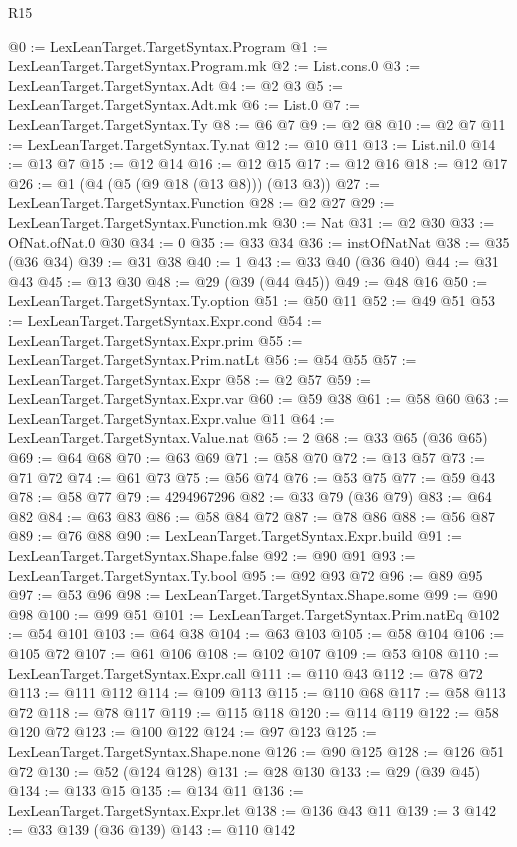 \begin{lexlean}{R15}
\begin{coremodule}
@0 := LexLeanTarget.TargetSyntax.Program
@1 := LexLeanTarget.TargetSyntax.Program.mk
@2 := List.cons.{0}
@3 := LexLeanTarget.TargetSyntax.Adt
@4 := @2 @3
@5 := LexLeanTarget.TargetSyntax.Adt.mk
@6 := List.{0}
@7 := LexLeanTarget.TargetSyntax.Ty
@8 := @6 @7
@9 := @2 @8
@10 := @2 @7
@11 := LexLeanTarget.TargetSyntax.Ty.nat
@12 := @10 @11
@13 := List.nil.{0}
@14 := @13 @7
@15 := @12 @14
@16 := @12 @15
@17 := @12 @16
@18 := @12 @17
@26 := @1 (@4 (@5 (@9 @18 (@13 @8))) (@13 @3))
@27 := LexLeanTarget.TargetSyntax.Function
@28 := @2 @27
@29 := LexLeanTarget.TargetSyntax.Function.mk
@30 := Nat
@31 := @2 @30
@33 := OfNat.ofNat.{0} @30
@34 := 0
@35 := @33 @34
@36 := instOfNatNat
@38 := @35 (@36 @34)
@39 := @31 @38
@40 := 1
@43 := @33 @40 (@36 @40)
@44 := @31 @43
@45 := @13 @30
@48 := @29 (@39 (@44 @45))
@49 := @48 @16
@50 := LexLeanTarget.TargetSyntax.Ty.option
@51 := @50 @11
@52 := @49 @51
@53 := LexLeanTarget.TargetSyntax.Expr.cond
@54 := LexLeanTarget.TargetSyntax.Expr.prim
@55 := LexLeanTarget.TargetSyntax.Prim.natLt
@56 := @54 @55
@57 := LexLeanTarget.TargetSyntax.Expr
@58 := @2 @57
@59 := LexLeanTarget.TargetSyntax.Expr.var
@60 := @59 @38
@61 := @58 @60
@63 := LexLeanTarget.TargetSyntax.Expr.value @11
@64 := LexLeanTarget.TargetSyntax.Value.nat
@65 := 2
@68 := @33 @65 (@36 @65)
@69 := @64 @68
@70 := @63 @69
@71 := @58 @70
@72 := @13 @57
@73 := @71 @72
@74 := @61 @73
@75 := @56 @74
@76 := @53 @75
@77 := @59 @43
@78 := @58 @77
@79 := 4294967296
@82 := @33 @79 (@36 @79)
@83 := @64 @82
@84 := @63 @83
@86 := @58 @84 @72
@87 := @78 @86
@88 := @56 @87
@89 := @76 @88
@90 := LexLeanTarget.TargetSyntax.Expr.build
@91 := LexLeanTarget.TargetSyntax.Shape.false
@92 := @90 @91
@93 := LexLeanTarget.TargetSyntax.Ty.bool
@95 := @92 @93 @72
@96 := @89 @95
@97 := @53 @96
@98 := LexLeanTarget.TargetSyntax.Shape.some
@99 := @90 @98
@100 := @99 @51
@101 := LexLeanTarget.TargetSyntax.Prim.natEq
@102 := @54 @101
@103 := @64 @38
@104 := @63 @103
@105 := @58 @104
@106 := @105 @72
@107 := @61 @106
@108 := @102 @107
@109 := @53 @108
@110 := LexLeanTarget.TargetSyntax.Expr.call
@111 := @110 @43
@112 := @78 @72
@113 := @111 @112
@114 := @109 @113
@115 := @110 @68
@117 := @58 @113 @72
@118 := @78 @117
@119 := @115 @118
@120 := @114 @119
@122 := @58 @120 @72
@123 := @100 @122
@124 := @97 @123
@125 := LexLeanTarget.TargetSyntax.Shape.none
@126 := @90 @125
@128 := @126 @51 @72
@130 := @52 (@124 @128)
@131 := @28 @130
@133 := @29 (@39 @45)
@134 := @133 @15
@135 := @134 @11
@136 := LexLeanTarget.TargetSyntax.Expr.let
@138 := @136 @43 @11
@139 := 3
@142 := @33 @139 (@36 @139)
@143 := @110 @142

\end{coremodule}
\end{lexlean}

